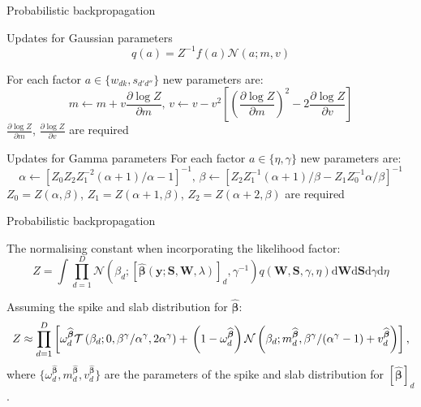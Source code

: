 \documentclass[9pt]{beamer}
\begin{document}
\begin{frame}{Probabilistic backpropagation}
\begin{block}{Updates for Gaussian parameters}
  \begin{equation*}
  q(a) = Z^{-1}f(a)\mathcal{N}(a; m, v) 
  \end{equation*}

For each factor $a \in \{w_{dk}, s_{d'd''}\}$ new parameters are:
  \begin{equation*}
  m\leftarrow m + v \frac{\partial \log Z}{\partial m}, \,
  v\leftarrow v - v^2\left[ \left(\frac{\partial \log Z}{\partial m}\right)^2 - 2 \frac{\partial \log Z}{\partial v}\right]
  \end{equation*}
  \alert{$\frac{\partial \log Z}{\partial m}$, $\frac{\partial \log Z}{\partial v}$ are required}
\end{block}

\begin{block}{Updates for Gamma parameters}
For each factor $a \in \{\eta, \gamma\}$ new parameters are:
  \begin{equation*}
  \alpha\leftarrow [Z_0Z_2Z_1^{-2}(\alpha+1)/\alpha -1]^{-1}, \,
  \beta\leftarrow [Z_2Z_1^{-1}(\alpha+1)/\beta - Z_1Z_0^{-1}\alpha/\beta]^{-1}
  \end{equation*}
  \alert{$Z_0 = Z(\alpha, \beta)$, $Z_1=Z(\alpha+1, \beta)$, $Z_2 = Z(\alpha+2, \beta)$ are required}
  \end{block}
\end{frame}

\begin{frame}{Probabilistic backpropagation}

The normalising constant when incorporating the likelihood factor:
    \begin{equation*}
  Z  = \int \prod_{d=1}^{D} \mathcal{N}(\beta_d ; [\widehat{\boldsymbol\beta}(\mathbf{y} ; \mathbf{S}, \mathbf{W}, \lambda)]_d, \gamma^{-1}) q(\mathbf{W}, \mathbf{S}, \gamma, \eta) \mathrm{d}\mathbf{W} \mathrm{d}\mathbf{S} \mathrm{d}\gamma \mathrm{d}\eta
  \end{equation*}
  
  Assuming the spike and slab distribution for $\widehat{\boldsymbol\beta}$:
\begin{equation*}
\label{eq:Z}
Z \approx \prod_{d=1}^D \left[\omega^{\widehat{\boldsymbol\beta}}_d  \mathcal{T}\left(\beta_d ; 0, \beta^\gamma / \alpha^\gamma, 2\alpha^\gamma\right) + \vphantom{m^{\widehat{\boldsymbol\beta}}_d} \left(1 - \omega^{\widehat{\boldsymbol\beta}}_d\right)\mathcal{N}\left(\beta_d ; m^{\widehat{\boldsymbol\beta}}_d,  \beta^\gamma / (\alpha^\gamma - 1) + v^{\widehat{\boldsymbol\beta}}_d\right)\right],
\end{equation*}
  where $\{\omega^{\widehat{\boldsymbol\beta}}_d, m^{\widehat{\boldsymbol\beta}}_d, v^{\widehat{\boldsymbol\beta}}_d\}$ are the parameters of the spike and slab distribution for $[\widehat{\boldsymbol\beta}]_d$.
  


\end{frame}
\end{document}
